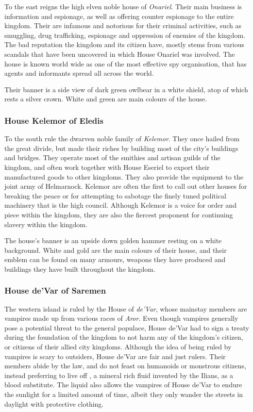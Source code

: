 To the east reigns the high elven noble house of \emph{Onariel}. Their main
business is information and espionage, as well as offering counter espionage
to the entire kingdom. Their are infamous and notorious for their criminal
activities, such as smuggling, drug trafficking, espionage and oppression
of enemies of the kingdom. The bad reputation the kingdom and its citizen
have, mostly stems from various scandals that have been uncovered in which
House Onariel was involved. The house is known world wide as one of the most
effective spy organisation, that has agents and informants spread all across
the world.

Their banner is a side view of dark green owlbear in a white shield, atop of
which rests a silver crown. White and green are main colours of the house.

\subsubsection{House Kelemor of Eledis}
\label{sec:House Kelemor}

To the south rule the dwarven noble family of \emph{Kelemor}. They once
hailed from the great divide, but made their riches by building most of
the city's buildings and bridges. They operate most of the smithies and
artisan guilds of the kingdom, and often work together with House Eseriel to
export their manufactured goods to other kingdoms. They also provide the
equipment to the joint army of Helmarnock. Kelemor are often the first to call
out other houses for breaking the peace or for attempting to sabotage the
finely tuned political machinery that is the high council. Although Kelemor is
a voice for order and piece within the kingdom, they are also the fiercest
proponent for continuing slavery within the kingdom.

The house's banner is an upside down golden hammer resting on a white
background. White and gold are the main colours of their house, and their
emblem can be found on many armours, weapons they have produced and buildings
they have built throughout the kingdom.

\subsubsection{House de'Var of Saremen}
\label{sec:House deVar}

The western island is ruled by the House of \emph{de'Var}, whose mainstay
members are vampires made up from various races of \emph{Aror}. Even though
vampires generally pose a potential threat to the general populace, House
de'Var had to sign a treaty during the foundation of the kingdom to not harm
any of the kingdom's citizen, or citizens of their allied city
kingdoms. Although the idea of being ruled by vampires is scary to outsiders,
House de'Var are fair and just rulers. Their members abide by the law, and do
not feast on humanoids or monstrous citizens, instead preferring to live off
, a mineral rich fluid invented by the Ilians, as a blood
substitute. The liquid also allows the vampires of House de'Var to endure the
sunlight for a limited amount of time, albeit they only wander the streets in
daylight with protective clothing.

